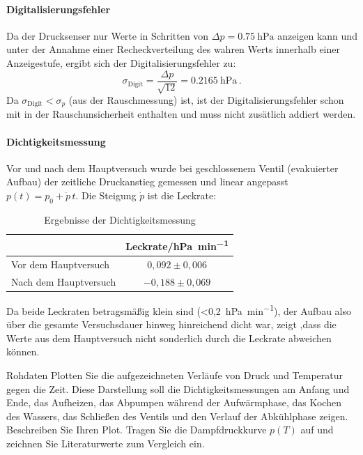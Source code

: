\documentclass{article}
\begin{document}
\paragraph{Digitalisierungsfehler}
Da der Drucksenser nur Werte in Schritten von $\Delta p = \SI{0.75}{\hecto\pascal}$ anzeigen kann und unter der Annahme einer Recheckverteilung des wahren Werts innerhalb einer Anzeigestufe, ergibt sich der Digitalisierungsfehler zu:
\begin{equation}
    \sigma_{\text{Digit}} = \frac{\Delta p}{\sqrt{12}} = \SI{0.2165}{\hecto\pascal} \,.
    \label{eq:digit}
\end{equation}
Da $\sigma_{\text{Digit}} < \sigma_p$ (aus der Rauschmessung) ist, ist der Digitalisierungsfehler schon mit in der Rauschunsicherheit enthalten und muss nicht zusätlich addiert werden.
\paragraph{Dichtigkeitsmessung}
Vor und nach dem Hauptversuch wurde bei geschlossenem Ventil (evakuierter Aufbau) der zeitliche Druckanstieg gemessen und linear angepasst $p(t) = p_0 + \dot{p}\, t$. Die Steigung $\dot p$ ist die Leckrate:
\begin{table}[htb]
    \centering
    \begin{tabular}{lc}
         \toprule
         & Leckrate/\si{\hecto\pascal\per\minute}\\
         \midrule
         Vor dem Hauptversuch &  $0,092 \pm 0,006$\\
         Nach dem Hauptversuch & $-0,188 \pm 0,069$\\
         \bottomrule
    \end{tabular}
    \caption{Ergebnisse der Dichtigkeitsmessung}
    \label{tab:dichtigkeit}
\end{table}

Da beide Leckraten betragsmäßig klein sind (\SI{<0,2}{\hecto\pascal\per\minute}), der Aufbau also über die gesamte Versuchsdauer hinweg hinreichend dicht war, zeigt ,dass die Werte aus dem Hauptversuch nicht sonderlich durch die Leckrate abweichen können.

\begin{aufgabe}{Rohdaten}
  Plotten Sie die aufgezeichneten Verläufe von Druck und Temperatur
  gegen die Zeit. Diese Darstellung soll die Dichtigkeitsmessungen am
  Anfang und Ende, das Aufheizen, das Abpumpen während der
  Aufwärmphase, das Kochen des Wassers, das Schließen des Ventils und
  den Verlauf der Abkühlphase zeigen. Beschreiben Sie Ihren
  Plot. Tragen Sie die Dampfdruckkurve $p(T)$ auf und zeichnen Sie
  Literaturwerte zum Vergleich ein.
\end{aufgabe}
\end{document}
